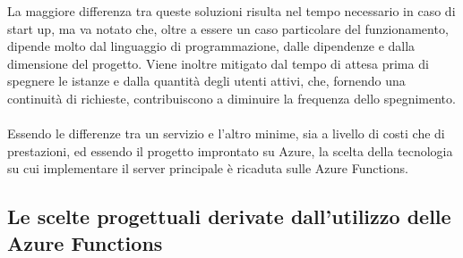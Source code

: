 La maggiore differenza tra queste soluzioni risulta nel tempo necessario in caso di start up,
ma va notato che, oltre a essere un caso particolare del funzionamento,
dipende molto dal linguaggio di programmazione,
dalle dipendenze e dalla dimensione del progetto.
Viene inoltre mitigato dal tempo di attesa prima di spegnere le istanze e
dalla quantità degli utenti attivi,
che, fornendo una continuità di richieste,
 contribuiscono a diminuire la frequenza dello spegnimento.\\
\\
Essendo le differenze tra un servizio e l'altro minime,
sia a livello di costi che di prestazioni,
ed essendo il progetto improntato su Azure,
la scelta della tecnologia su cui implementare il server principale è ricaduta sulle Azure Functions.\\

\subsection{Le scelte progettuali derivate dall'utilizzo delle Azure Functions}

